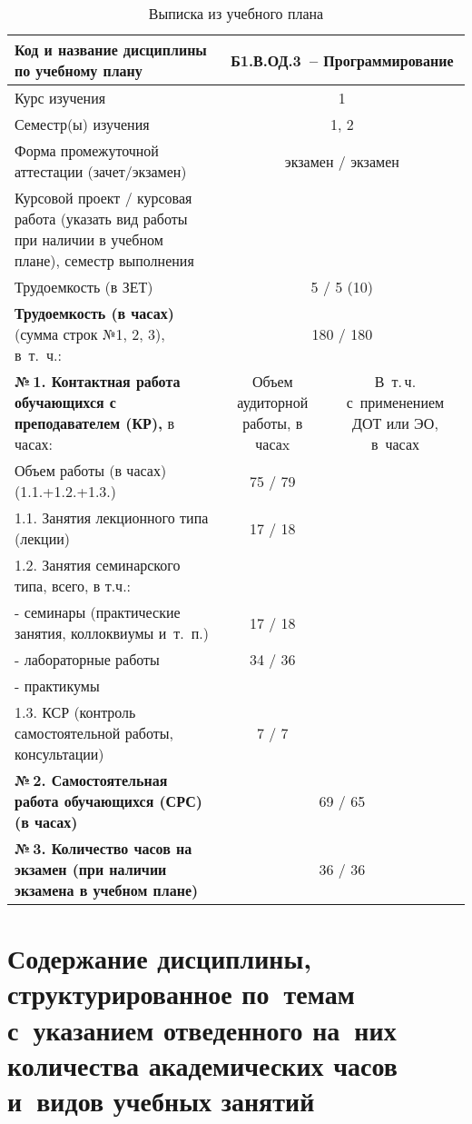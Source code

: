 \documentclass[a4paper,12pt]{article}
\begin{document}
\begin{table}[H]
\caption{Выписка из учебного плана} 
\begin{tabular}{|p{9cm}|c|c|}
\hline
Код и название дисциплины по учебному плану & \multicolumn{2}{p{6cm}|}{Б1.В.ОД.3\ -- Программирование }\\
\hline
Курс изучения &\multicolumn{2}{c|}{ 1 }\\
\hline
Семестр(ы) изучения &\multicolumn{2}{c|}{ 1, 2 }\\
\hline
Форма промежуточной аттестации (зачет/экзамен) &\multicolumn{2}{c|}{ экзамен / экзамен }\\
\hline
Курсовой проект / курсовая работа (указать вид работы при наличии в учебном плане), семестр выполнения &\multicolumn{2}{c|}{ }\\
\hline
Трудоемкость (в ЗЕТ) &\multicolumn{2}{c|}{ 5 / 5 (10) }\\
\hline
{\bf Трудоемкость (в часах)} (сумма строк №1, 2, 3), в~т.~ч.:& \multicolumn{2}{c|}{180 / 180}\\
\hline
\textbf{№\,1. Контактная работа обучающихся с преподавателем (КР),} в часах:
& \multicolumn{1}{p{3cm}|}{\centering Объем аудиторной работы, в часаx}
& \multicolumn{1}{p{3cm}|}{\centering\arraybackslash В~т.\,ч. с~применением ДОТ или ЭО, в~часах}\\
\hline  
Объем работы (в часах) (1.1.+1.2.+1.3.)& 75 / 79 & \\
\hline
1.1. Занятия лекционного типа (лекции) & 17 / 18 & \\
\hline
1.2. Занятия семинарского типа, всего, в т.ч.: & & \\
\hline
- семинары (практические занятия, коллоквиумы и~т.~п.)  & 17 / 18 & \\
\hline
- лабораторные работы& 34 / 36 & \\
\hline
- практикумы & & \\
\hline
1.3. КСР (контроль самостоятельной работы, консультации)& 7 / 7 & \\
\hline
{\bf №\,2. Самостоятельная работа обучающихся (СРС) (в часах)}& \multicolumn{2}{c|}{69 / 65}\\
\hline
{\bf №\,3. Количество часов на экзамен (при наличии экзамена в учебном плане)}& \multicolumn{2}{c|}{36 / 36}\\
\hline
\end{tabular}
\end{table}



\newpage
\section{Содержание дисциплины, структурированное по~темам с~указанием отведенного на~них количества академических часов и~видов учебных занятий}
\end{document}

